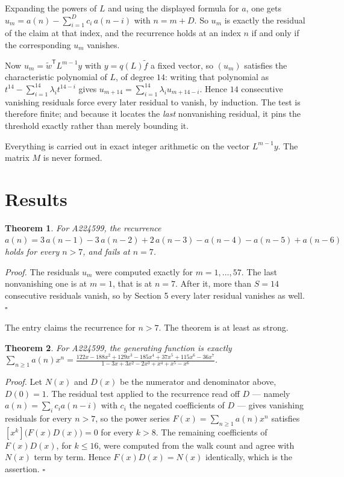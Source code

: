 \documentclass[11pt]{article}
\newtheorem{theorem}{Theorem}
\theoremstyle{definition}
\begin{document}
Expanding the powers of $L$ and using the displayed formula for $a$, one gets $u_m = a(n) - \sum_{i=1}^{D} c_i\,a(n-i)$ with $n = m + D$. So $u_m$ is exactly the residual of the claim at that index, and the recurrence holds at an index $n$ if and only if the corresponding $u_m$ vanishes.

Now $u_m = \tilde w^{\mathsf T} L^{m-1} y$ with $y = q(L)\tilde f$ a fixed vector, so $(u_m)$ satisfies the characteristic polynomial of $L$, of degree $14$: writing that polynomial as $t^{14} - \sum_{i=1}^{14} \lambda_i t^{14-i}$ gives $u_{m+14} = \sum_{i=1}^{14} \lambda_i u_{m+14-i}$. Hence $14$ consecutive vanishing residuals force every later residual to vanish, by induction. The test is therefore finite; and because it locates the {\itshape last} nonvanishing residual, it pins the threshold exactly rather than merely bounding it.

Everything is carried out in exact integer arithmetic on the vector $L^{m-1}y$. The matrix $M$ is never formed.

\section{Results}

\begin{theorem} For A224599, the recurrence $a(n) = 3\,a(n-1) - 3\,a(n-2) + 2\,a(n-3) - a(n-4) - a(n-5) + a(n-6)$ holds for every $n > 7$, and fails at $n = 7$.\end{theorem}

{\itshape Proof.} The residuals $u_m$ were computed exactly for $m = 1,\dots,57$. The last nonvanishing one is at $m = 1$, that is at $n = 7$. After it, more than $S = 14$ consecutive residuals vanish, so by Section 5 every later residual vanishes as well. $\square$

The entry claims the recurrence for $n > 7$. The theorem is at least as strong.

\begin{theorem} For A224599, the generating function is exactly $\sum_{n\ge 1} a(n)x^n = \frac{122x - 188x^{2} + 129x^{3} - 185x^{4} + 37x^{5} + 115x^{6} - 36x^{7}}{1 - 3x + 3x^{2} - 2x^{3} + x^{4} + x^{5} - x^{6}}$.\end{theorem}

{\itshape Proof.} Let $N(x)$ and $D(x)$ be the numerator and denominator above, $D(0)=1$. The residual test applied to the recurrence read off $D$ --- namely $a(n) = \sum_i c_i a(n-i)$ with $c_i$ the negated coefficients of $D$ --- gives vanishing residuals for every $n > 7$, so the power series $F(x)=\sum_{n\ge 1}a(n)x^n$ satisfies $[x^k]\bigl(F(x)D(x)\bigr) = 0$ for every $k > 8$. The remaining coefficients of $F(x)D(x)$, for $k \le 16$, were computed from the walk count and agree with $N(x)$ term by term. Hence $F(x)D(x) = N(x)$ identically, which is the assertion. $\square$
\end{document}
